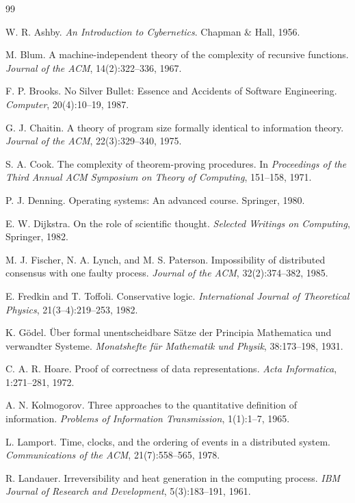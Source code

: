 \documentclass[11pt]{article}
\begin{document}
\newpage
\begin{thebibliography}{99}

W. R. Ashby.
\textit{An Introduction to Cybernetics}.
Chapman \& Hall, 1956.

M. Blum.
A machine-independent theory of the complexity of recursive functions.
\textit{Journal of the ACM}, 14(2):322--336, 1967.

F. P. Brooks.
No Silver Bullet: Essence and Accidents of Software Engineering.
\textit{Computer}, 20(4):10--19, 1987.

G. J. Chaitin.
A theory of program size formally identical to information theory.
\textit{Journal of the ACM}, 22(3):329--340, 1975.

S. A. Cook.
The complexity of theorem-proving procedures.
In \textit{Proceedings of the Third Annual ACM Symposium on Theory of Computing}, 151--158, 1971.

P. J. Denning.
Operating systems: An advanced course.
Springer, 1980.

E. W. Dijkstra.
On the role of scientific thought.
\textit{Selected Writings on Computing}, Springer, 1982.

M. J. Fischer, N. A. Lynch, and M. S. Paterson.
Impossibility of distributed consensus with one faulty process.
\textit{Journal of the ACM}, 32(2):374--382, 1985.

E. Fredkin and T. Toffoli.
Conservative logic.
\textit{International Journal of Theoretical Physics}, 21(3--4):219--253, 1982.

K. Gödel.
Über formal unentscheidbare Sätze der Principia Mathematica und verwandter Systeme.
\textit{Monatshefte für Mathematik und Physik}, 38:173--198, 1931.

C. A. R. Hoare.
Proof of correctness of data representations.
\textit{Acta Informatica}, 1:271--281, 1972.

A. N. Kolmogorov.
Three approaches to the quantitative definition of information.
\textit{Problems of Information Transmission}, 1(1):1--7, 1965.

L. Lamport.
Time, clocks, and the ordering of events in a distributed system.
\textit{Communications of the ACM}, 21(7):558--565, 1978.

R. Landauer.
Irreversibility and heat generation in the computing process.
\textit{IBM Journal of Research and Development}, 5(3):183--191, 1961.


\end{thebibliography}
\end{document}
